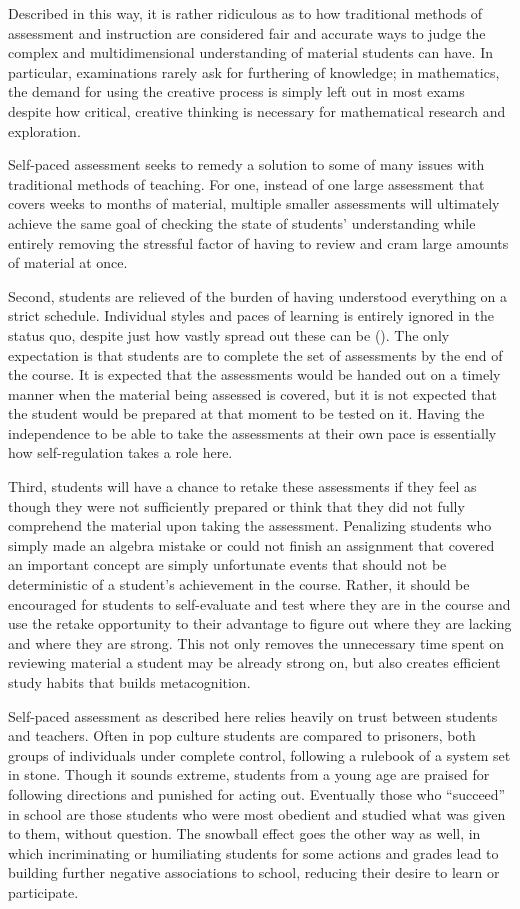 Described in this way, it is rather ridiculous as to how traditional methods of assessment and instruction are considered fair and accurate ways to judge the complex and multidimensional understanding of material students can have. In particular, examinations rarely ask for furthering of knowledge; in mathematics, the demand for using the creative process is simply left out in most exams despite how critical, creative thinking is necessary for mathematical research and exploration.

Self-paced assessment seeks to remedy a solution to some of many issues with traditional methods of teaching. For one, instead of one large assessment that covers weeks to months of material, multiple smaller assessments will ultimately achieve the same goal of checking the state of students' understanding while entirely removing the stressful factor of having to review and cram large amounts of material at once.

Second, students are relieved of the burden of having understood everything on a strict schedule. Individual styles and paces of learning is entirely ignored in the status quo, despite just how vastly spread out these can be (\cite{busato_intellectual_2000}). The only expectation is that students are to complete the set of assessments by the end of the course. It is expected that the assessments would be handed out on a timely manner when the material being assessed is covered, but it is not expected that the student would be prepared at that moment to be tested on it. Having the independence to be able to take the assessments at their own pace is essentially how self-regulation takes a role here.

Third, students will have a chance to retake these assessments if they feel as though they were not sufficiently prepared or think that they did not fully comprehend the material upon taking the assessment. Penalizing students who simply made an algebra mistake or could not finish an assignment that covered an important concept are simply unfortunate events that should not be deterministic of a student's achievement in the course. Rather, it should be encouraged for students to self-evaluate and test where they are in the course and use the retake opportunity to their advantage to figure out where they are lacking and where they are strong. This not only removes the unnecessary time spent on reviewing material a student may be already strong on, but also creates efficient study habits that builds metacognition.

Self-paced assessment as described here relies heavily on trust between students and teachers. Often in pop culture students are compared to prisoners, both groups of individuals under complete control, following a rulebook of a system set in stone. Though it sounds extreme, students from a young age are praised for following directions and punished for acting out. Eventually those who ``succeed'' in school are those students who were most obedient and studied what was given to them, without question. The snowball effect goes the other way as well, in which incriminating or humiliating students for some actions and grades lead to building further negative associations to school, reducing their desire to learn or participate.

